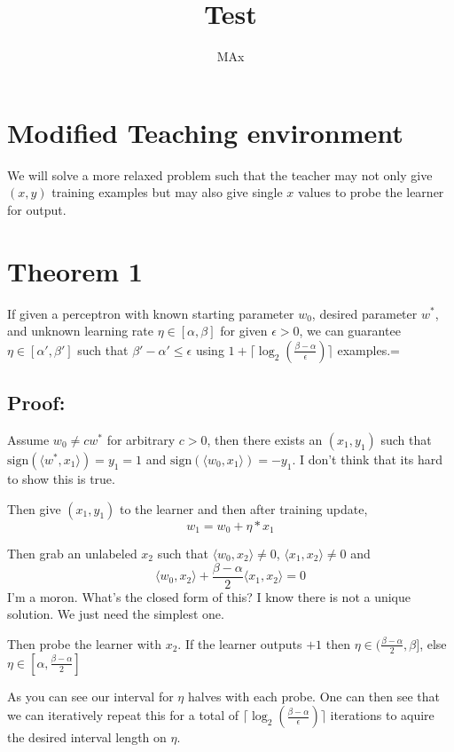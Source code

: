\documentclass{article}
\title{Test}
\author{MAx}
\begin{document}
\maketitle

\section*{Modified Teaching environment}
We will solve a more relaxed problem such that the teacher may not only give $(x,y)$ training examples but may also give single $x$ values to probe the learner for output. 

\section*{Theorem 1}
If given a perceptron with known starting parameter $w_0$, desired parameter $w^*$, and unknown learning rate $\eta \in [\alpha , \beta]$ for given $\epsilon > 0$, we can guarantee $\eta \in [\alpha', \beta']$ such that $\beta' - \alpha' \leq \epsilon$ using $1 + \lceil \log_2(\frac{\beta - \alpha}{\epsilon})\rceil$ examples.=

\subsection*{Proof:}
Assume $w_0 \neq cw^*$ for arbitrary $c > 0$, then there exists an $(x_1, y_1)$ such that $\text{sign}(\langle w^*,x_1 \rangle) = y_1 = 1$ and $\text{sign}(\langle w_0,x_1 \rangle) = -y_1$.
\color{red}
I don't think that its hard to show this is true.
\color{black}

Then give $(x_1, y_1)$ to the learner and then after training update,
$$
w_1 = w_0 + \eta* x_1
$$

Then grab an unlabeled $x_2$ such that
$\langle w_0,x_2 \rangle \neq 0$, $\langle x_1, x_2 \rangle \neq 0$
and 
$$
\langle w_0,x_2 \rangle + \frac{\beta - \alpha}{2} \langle x_1, x_2 \rangle = 0
$$
\color{red}
I'm a moron. What's the closed form of this? I know there is not a unique solution. We just need the simplest one.
\color{black}

Then probe the learner with $x_2$. If the learner outputs $+1$ then
$\eta \in (\frac{\beta - \alpha}{2} , \beta]$, else 
$\eta \in [\alpha,\frac{\beta - \alpha}{2}]$

As you can see our interval for $\eta$ halves with each probe. One can then see that we can iteratively repeat this for a total of $ \lceil \log_2(\frac{\beta - \alpha}{\epsilon})\rceil$ iterations to aquire the desired interval length on $\eta$.
\end{document}
